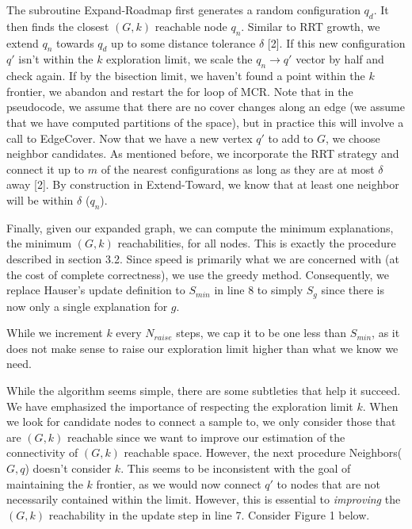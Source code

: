 The subroutine Expand-Roadmap first generates a random configuration $q_d$. It then finds the closest $(G,k)$ reachable node $q_n$. Similar to RRT growth, we  extend $q_n$ towards $q_d$ up to some distance tolerance $\delta$ [2]. If this new configuration $q'$ isn't within the $k$ exploration limit, we scale the $q_n \rightarrow q'$ vector by  half and check again. If by the bisection limit, we haven't found a point within the $k$ frontier, we abandon and restart the for loop of MCR. Note that in the pseudocode, we assume that there are no cover changes along an edge (we assume that we have computed partitions of the space), but in practice this will involve a call to EdgeCover. Now that we have a new vertex $q'$ to add to $G$, we choose neighbor candidates. As mentioned before, we incorporate the RRT strategy and connect it up to $m$ of the nearest configurations as long as they are at most $\delta$ away [2]. By construction in Extend-Toward, we know that at least one neighbor will be within $\delta$ ($q_n$). 

Finally, given our expanded graph, we can compute the minimum explanations, the minimum $(G,k)$ reachabilities, for all nodes. This is exactly the procedure described in section 3.2. Since speed is primarily what we are concerned with (at the cost of complete correctness), we use the greedy method. Consequently, we replace Hauser's update definition to $S_{min}$ in line 8 to simply $S_g$ since there is now only a single explanation for $g$. 

While we increment $k$ every $N_{raise}$ steps, we cap it to be one less than $S_{min}$, as it does not make sense to raise our exploration limit higher than what we know we need. 

While the algorithm seems simple, there are some subtleties that help it succeed. We have emphasized the importance of respecting the exploration limit $k$. When we look for candidate nodes to connect a sample to, we only consider those that are $(G,k)$ reachable since we want to improve our estimation of the connectivity of $(G,k)$ reachable space. However, the next procedure Neighbors($G,q$) doesn't consider $k$. This seems to be inconsistent with the goal of maintaining the $k$ frontier, as we would now connect $q'$ to nodes that are not necessarily contained within the limit. However, this is essential to \emph{improving} the $(G,k)$ reachability in the update step in line 7. Consider Figure 1 below. 

